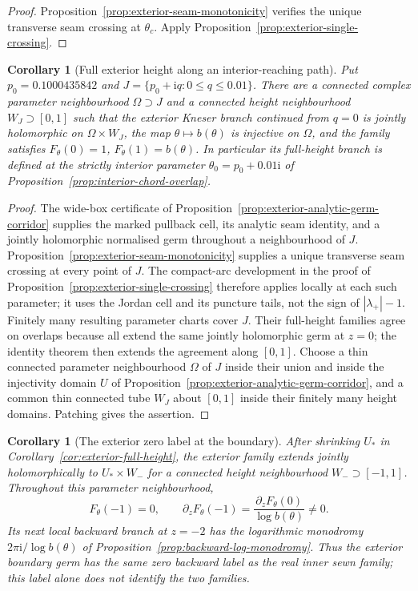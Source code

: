 \documentclass[11pt,a4paper]{article}
\newtheorem{corollary}[theorem]{Corollary}
\theoremstyle{definition}
\newcommand{\ii}{\mathrm{i}}
\begin{document}
\begin{proof}
Proposition~\ref{prop:exterior-seam-monotonicity} verifies the
unique transverse seam crossing at $\theta_c$.
Apply Proposition~\ref{prop:exterior-single-crossing}.
\end{proof}

\begin{corollary}[Full exterior height along an interior-reaching path]
\label{cor:exterior-wide-full-height}
Put $p_0=0.1000435842$ and
$J=\{p_0+\ii q:0\le q\le0.01\}$.  There are a connected
complex parameter neighbourhood $\Omega\supset J$ and a connected
height neighbourhood $W_J\supset[0,1]$ such that the exterior
Kneser branch continued from $q=0$ is jointly holomorphic on
$\Omega\times W_J$, the map $\theta\mapsto b(\theta)$ is
injective on $\Omega$, and the family satisfies
$F_\theta(0)=1$, $F_\theta(1)=b(\theta)$.
In particular its full-height branch is defined at the strictly
interior parameter $\theta_0=p_0+0.01\ii$ of
Proposition~\ref{prop:interior-chord-overlap}.
\end{corollary}

\begin{proof}
The wide-box certificate of
Proposition~\ref{prop:exterior-analytic-germ-corridor} supplies
the marked pullback cell, its analytic seam identity, and a jointly
holomorphic normalised germ throughout a neighbourhood of $J$.
Proposition~\ref{prop:exterior-seam-monotonicity} supplies a unique
transverse seam crossing at every point of $J$.  The compact-arc
development in the proof of
Proposition~\ref{prop:exterior-single-crossing} therefore applies
locally at each such parameter; it uses the Jordan cell and its
puncture tails, not the sign of $|\lambda_+|-1$.
Finitely many resulting parameter charts cover $J$.  Their
full-height families agree on overlaps because all extend the
same jointly holomorphic germ at $z=0$; the identity theorem
then extends the agreement along $[0,1]$.  Choose a thin connected
parameter neighbourhood $\Omega$ of $J$ inside their union and
inside the injectivity domain $U$ of
Proposition~\ref{prop:exterior-analytic-germ-corridor}, and
a common thin connected tube $W_J$ about $[0,1]$ inside their
finitely many height domains.  Patching gives the assertion.
\end{proof}

\begin{corollary}[The exterior zero label at the boundary]
\label{cor:exterior-boundary-zero}
After shrinking $U_*$ in Corollary~\ref{cor:exterior-full-height},
the exterior family extends jointly holomorphically to
$U_*\times W_-$ for a connected height neighbourhood
$W_-\supset[-1,1]$.  Throughout this parameter neighbourhood,
\[
 F_\theta(-1)=0,\qquad
 \partial_zF_\theta(-1)=
   \frac{\partial_zF_\theta(0)}{\log b(\theta)}\ne0.
\]
Its next local backward branch at $z=-2$ has the logarithmic
monodromy $2\pi\ii/\log b(\theta)$ of
Proposition~\ref{prop:backward-log-monodromy}.
Thus the exterior boundary germ has the same zero backward label
as the real inner sewn family; this label alone does not identify
the two families.
\end{corollary}
\end{document}
